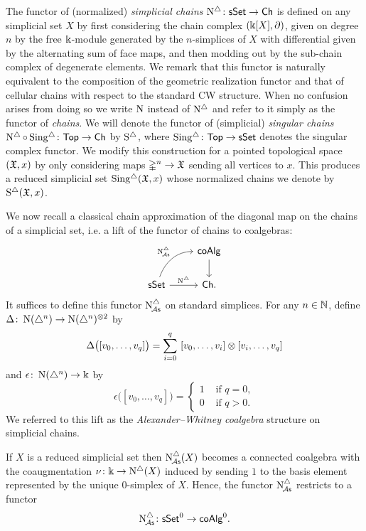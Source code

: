 The functor of (normalized) \textit{simplicial chains} $\operatorname{N^{\triangle}} \colon \mathsf{sSet} \to \mathsf{Ch}$ is defined on any simplicial set $X$ by first considering the chain complex $(\Bbbk[X], \partial)$, given on degree $n$ by the free $\Bbbk$-module generated by the $n$-simplices of $X$ with differential given by the alternating sum of face maps, and then modding out by the sub-chain complex of degenerate elements.
We remark that this functor is naturally equivalent to the composition of the geometric realization functor and that of cellular chains with respect to the standard CW structure.
When no confusion arises from doing so we write $\operatorname{N}$ instead of $\operatorname{N^{\triangle}}$ and refer to it simply as the functor of \textit{chains}.
We will denote the functor of (simplicial) \textit{singular chains} $\operatorname{N^{\triangle}} \circ \operatorname{Sing^{\triangle}} \colon \mathsf{Top} \to \mathsf{Ch}$ by $\operatorname{S^{\triangle}}$, where $\operatorname{Sing^{\triangle}} \colon \mathsf{Top} \to \mathsf{sSet}$ denotes the singular complex functor. We modify this construction for a pointed topological space $(\mathfrak{X},x)$ by only considering maps $\mathbb{\Delta}^n \to \mathfrak{X}$ sending all vertices to $x$.
This produces a reduced simplicial set $\operatorname{Sing^{\triangle}}(\mathfrak{X},x)$ whose normalized chains we denote by $\operatorname{S^{\triangle}}(\mathfrak{X},x)$.

We now recall a classical chain approximation of the diagonal map on the chains of a simplicial set, i.e. a lift of the functor of chains to coalgebras:
\[
\begin{tikzcd}
	& \coAlg \arrow[d] \\
	\sSet \arrow[r, "\schains"] \arrow[ur, "\schainsA", out=70, in=180] & \Ch.
\end{tikzcd}
\]
It suffices to define this functor $\operatorname{N^{\triangle}_{\!{\mathcal{A}\mathsf{s}}}}$ on standard simplices. For any $n \in \mathbb{N}$, define $\Delta \colon \operatorname{N}(\triangle^n) \to \operatorname{N}(\triangle^n)^{\otimes2}$ by
\[
\Delta \big( [v_0, \dots, v_q] \big) = \sum_{i=0}^q \ [v_0, \dots, v_i] \otimes [v_i, \dots, v_q]
\]
and $\epsilon \colon \operatorname{N}(\triangle^n) \to \Bbbk$ by
\[
\epsilon \big( [v_0, \dots, v_q] \big) = \begin{cases} 1 & \text{ if } q = 0, \\ 0 & \text{ if } q>0. \end{cases}
\]
We referred to this lift as the \textit{Alexander--Whitney coalgebra} structure on simplicial chains.

If $X$ is a reduced simplicial set then $\operatorname{N^{\triangle}_{\!{\mathcal{A}\mathsf{s}}}}(X)$ becomes a connected coalgebra with the coaugmentation $\nu \colon \Bbbk \to \operatorname{N^{\triangle}}(X)$ induced by sending $1$ to the basis element represented by the unique $0$-simplex of $X$.
Hence, the functor $\operatorname{N^{\triangle}_{\!{\mathcal{A}\mathsf{s}}}}$ restricts to a functor
\[
\operatorname{N^{\triangle}_{\!{\mathcal{A}\mathsf{s}}}} \colon \mathsf{sSet}^0 \to \mathsf{coAlg}^0.
\]

